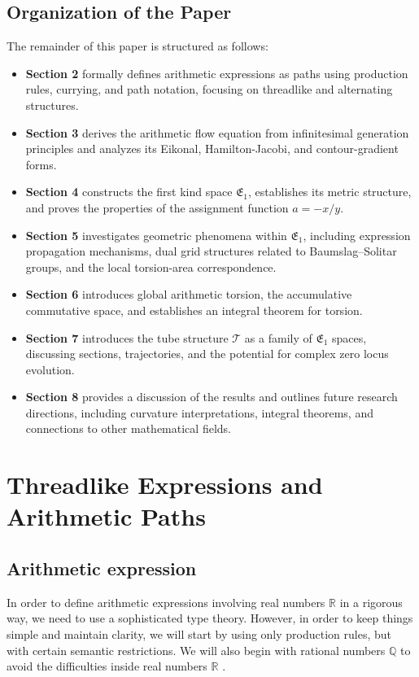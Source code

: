 \documentclass[12pt]{article}
\begin{document}
\subsection{Organization of the Paper}
The remainder of this paper is structured as follows:
\begin{itemize}
  \item \textbf{Section 2} formally defines arithmetic expressions as paths using production rules, currying, and path notation, focusing on threadlike and alternating structures.
  \item \textbf{Section 3} derives the arithmetic flow equation from infinitesimal generation principles and analyzes its Eikonal, Hamilton-Jacobi, and contour-gradient forms.
  \item \textbf{Section 4} constructs the first kind space \( \mathfrak{E}_1 \), establishes its metric structure, and proves the properties of the assignment function \(a=-x/y\).
  \item \textbf{Section 5} investigates geometric phenomena within \( \mathfrak{E}_1 \), including expression propagation mechanisms, dual grid structures related to Baumslag–Solitar groups, and the local torsion-area correspondence.
  \item \textbf{Section 6} introduces global arithmetic torsion, the accumulative commutative space, and establishes an integral theorem for torsion.
  \item \textbf{Section 7} introduces the tube structure \( \mathcal{T} \) as a family of \( \mathfrak{E}_1 \) spaces, discussing sections, trajectories, and the potential for complex zero locus evolution.
  \item \textbf{Section 8} provides a discussion of the results and outlines future research directions, including curvature interpretations, integral theorems, and connections to other mathematical fields.
\end{itemize}

\section{Threadlike Expressions and Arithmetic Paths}

\subsection{Arithmetic expression}\label{subsec:arithmetic-expression-full}
In order to define arithmetic expressions involving real numbers  $\mathbb{R}$ in a rigorous way, we need to use a sophisticated type theory.
However, in order to keep things simple and maintain clarity, we will start by using only production rules, but with certain semantic restrictions.
We will also begin with rational numbers $\mathbb{Q}$ to avoid the difficulties inside real numbers $\mathbb{R}$ .
\end{document}
